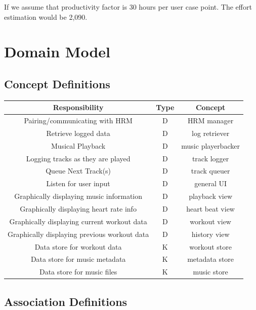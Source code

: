 \documentclass[letterpaper,english, 12pt]{scrreprt}
\begin{document}
If we assume that productivity factor is 30 hours per user case point. The effort estimation would be 2,090.

\chapter{Domain Model}
    \section{Concept Definitions}
		\begin{center}
		\renewcommand{\arraystretch}{1.5}
	        \begin{tabular}[h]{|c|c|c|}
	           \hline
	           Responsibility & Type & Concept\\
	           \hline
	           Pairing/communicating with HRM & D & HRM manager\\
	           \hline
	           Retrieve logged data & D & log retriever\\
	           \hline
	           Musical Playback & D & music playerbacker\\
	           \hline
	           Logging tracks as they are played & D & track logger\\
	           \hline
	           Queue Next Track(s) & D & track queuer\\
	           \hline
	           Listen for user input & D & general UI\\
	           \hline
	           Graphically displaying music information & D & playback view\\
	           \hline
	           Graphically displaying heart rate info & D & heart beat view\\
	           \hline
	           Graphically displaying current workout data & D & workout view\\
	           \hline
	           Graphically displaying previous workout data & D & history view\\
	           \hline
	           Data store for workout data & K & workout store\\
	           \hline
	           Data store for music metadata & K & metadata store\\
	           \hline
	           Data store for music files & K & music store\\
	           \hline
	       \end{tabular}
		\end{center}
	   
    \section{Association Definitions}
		
\end{document}
